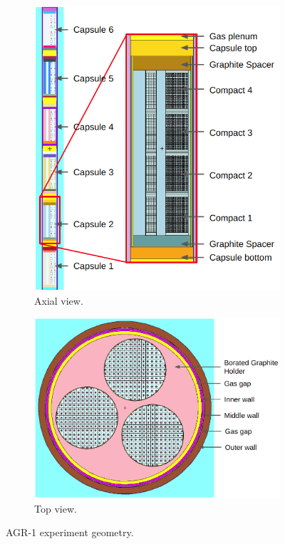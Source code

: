 \begin{figure}[htbp!] %
  \centering
  \begin{subfigure}{0.49\textwidth}
    \centering
    \includegraphics[width=0.9\linewidth]{figures/agr-paper-1}
    \caption{Axial view.}
    \label{fig:agr-a}
  \end{subfigure}
  \begin{subfigure}{0.49\textwidth}
    \centering
    \includegraphics[width=0.9\linewidth]{figures/agr-paper-2}
    \caption{Top view.}
    \label{fig:agr-b}
  \end{subfigure}
  \caption[benchmark]{AGR-1 experiment geometry.}
  \label{fig:agr-geo}
\end{figure}

